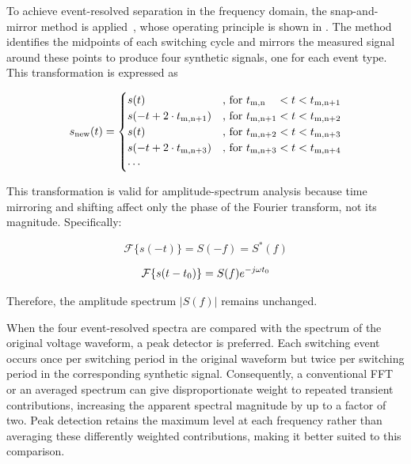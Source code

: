 To achieve event-resolved separation in the frequency domain, the snap-and-mirror method is applied~\cite{kragl_impact_2024}, whose operating principle is shown in . 
The method identifies the midpoints of each switching cycle  and mirrors the measured signal around these points to produce four synthetic signals, one for each event type. This transformation is expressed as

\begin{equation}
	s_\mathrm{new}(t) = 
	\begin{cases}
		s(t) 					 		& \text{, for } {t}_{\mathrm{m,n}}~~~< t < {t}_{\mathrm{m,n+1}} \\
		s(-t + 2\cdot{t}_{\mathrm{m,n+1}}) 	& \text{, for } {t}_{\mathrm{m,n+1}} < t < {t}_{\mathrm{m,n+2}} \\
		s(t) 					 		& \text{, for } {t}_{\mathrm{m,n+2}} < t < {t}_{\mathrm{m,n+3}} \\
		s(-t + 2\cdot{t}_{\mathrm{m,n+3}}) 	& \text{, for } {t}_{\mathrm{m,n+3}} < t < {t}_{\mathrm{m,n+4}} \\
		\cdots
	\end{cases}
	\label{eq:snap}
\end{equation}

This transformation is valid for amplitude-spectrum analysis because time mirroring and shifting affect only the phase of the Fourier transform, not its magnitude. Specifically:

\begin{equation}
	\mathcal{F}\{s(-t)\} = S(-f) = S^\ast(f)
\end{equation}

\begin{equation}
	\mathcal{F}\{s(t-{t}_{\mathrm{0}})\} = S(f)e^{-j\omega {t}_{\mathrm{0}}}
\end{equation}

Therefore, the amplitude spectrum $|S(f)|$ remains unchanged. 

When the four event-resolved spectra are compared with the spectrum of the original voltage waveform, a peak detector is preferred. 
Each switching event occurs once per switching period in the original waveform but twice per switching period in the corresponding synthetic signal. 
Consequently, a conventional FFT or an averaged spectrum can give disproportionate weight to repeated transient contributions, increasing the apparent spectral magnitude by up to a factor of two. 
Peak detection retains the maximum level at each frequency rather than averaging these differently weighted contributions, making it better suited to this comparison.



